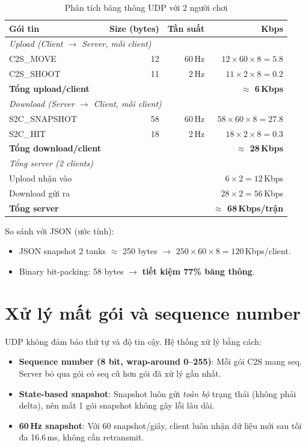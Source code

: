 \documentclass[12pt,a4paper]{report}
\begin{document}
\begin{table}[H]
\centering
\caption{Phân tích băng thông UDP với 2 người chơi}
\label{tab:bandwidth}
\begin{tabular}{lrrr}
\toprule
\textbf{Gói tin} & \textbf{Size (bytes)} & \textbf{Tần suất} & \textbf{Kbps} \\
\midrule
\multicolumn{4}{l}{\textit{Upload (Client $\rightarrow$ Server, mỗi client)}} \\
C2S\_MOVE  & 12 & 60\,Hz & $12 \times 60 \times 8 = 5.8$ \\
C2S\_SHOOT & 11 & 2\,Hz  & $11 \times 2 \times 8 = 0.2$ \\
\textbf{Tổng upload/client} & & & \textbf{$\approx$ 6\,Kbps} \\
\midrule
\multicolumn{4}{l}{\textit{Download (Server $\rightarrow$ Client, mỗi client)}} \\
S2C\_SNAPSHOT & 58 & 60\,Hz & $58 \times 60 \times 8 = 27.8$ \\
S2C\_HIT      & 18 & 2\,Hz  & $18 \times 2 \times 8 = 0.3$ \\
\textbf{Tổng download/client} & & & \textbf{$\approx$ 28\,Kbps} \\
\midrule
\multicolumn{4}{l}{\textit{Tổng server (2 clients)}} \\
Upload nhận vào  & & & $6 \times 2 = 12$\,Kbps \\
Download gửi ra  & & & $28 \times 2 = 56$\,Kbps \\
\textbf{Tổng server} & & & \textbf{$\approx$ 68\,Kbps/trận} \\
\bottomrule
\end{tabular}
\end{table}

So sánh với JSON (ước tính):
\begin{itemize}
  \item JSON snapshot 2 tanks $\approx$ 250 bytes $\rightarrow$ $250 \times 60 \times 8 = 120$\,Kbps/client.
  \item Binary bit-packing: 58 bytes $\rightarrow$ \textbf{tiết kiệm 77\% băng thông}.
\end{itemize}

\section{Xử lý mất gói và sequence number}

UDP không đảm bảo thứ tự và độ tin cậy. Hệ thống xử lý bằng cách:

\begin{itemize}
  \item \textbf{Sequence number (8 bit, wrap-around 0--255)}: Mỗi gói C2S mang seq. Server bỏ qua gói có seq cũ hơn gói đã xử lý gần nhất.
  \item \textbf{State-based snapshot}: Snapshot luôn gửi \textit{toàn bộ} trạng thái (không phải delta), nên mất 1 gói snapshot không gây lỗi lâu dài.
  \item \textbf{60\,Hz snapshot}: Với 60 snapshot/giây, client luôn nhận dữ liệu mới sau tối đa 16.6\,ms, không cần retransmit.
\end{itemize}
\end{document}
